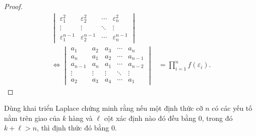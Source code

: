 \begin{proof}
\begin{align*}
\begin{vmatrix}
            \varepsilon_{1}^{2}   & \varepsilon_{2}^{2}   & \cdots & \varepsilon_{n}^{2}   \\
            \vdots                & \vdots                & \ddots & \vdots                \\
            \varepsilon_{1}^{n-1} & \varepsilon_{2}^{n-1} & \cdots & \varepsilon_{n}^{n-1}
        \end{vmatrix} \\
        \Longleftrightarrow
        \begin{vmatrix}
            a_{1}   & a_{2}  & a_{3}  & \cdots & a_{n}   \\
            a_{n}   & a_{1}  & a_{2}  & \cdots & a_{n-1} \\
            a_{n-1} & a_{n}  & a_{1}  & \cdots & a_{n-2} \\
            \vdots  & \vdots & \vdots & \ddots & \vdots  \\
            a_{2}   & a_{3}  & a_{4}  & \cdots & a_{1}
        \end{vmatrix}
         & =
        \prod^{n}_{i=1}f(\varepsilon_{i}).
    \end{align*}
\end{proof}

\begin{exercise}
    Dùng khai triển Laplace chứng minh rằng nếu một định thức cỡ $n$ có các yếu tố nằm trên giao của $k$ hàng và $\ell$ cột xác định nào đó đều bằng 0, trong đó $k + \ell > n$, thì định thức đó bằng 0.
\end{exercise}

